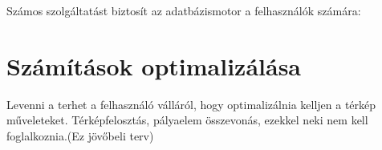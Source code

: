 
Számos szolgáltatást biztosít az adatbázismotor a felhasználók számára:

\section{Számítások optimalizálása}

Levenni a terhet a felhasználó válláról, hogy optimalizálnia kelljen a térkép műveleteket. Térképfelosztás, pályaelem összevonás, ezekkel neki nem kell foglalkoznia.(Ez jövőbeli terv)
